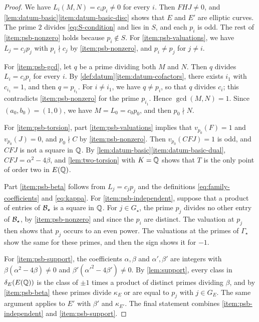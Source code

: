 \begin{proof}
We have $L_i(M,N)=c_ip_i\ne0$ for every $i$. Then $FHJ\ne0$, and \cref{lem:datum-basic}\ref{item:datum-basic-disc} shows that $E$ and $E'$ are elliptic curves. The prime $2$ divides \eqref{eq:S-condition} and lies in $S$, and each $p_i$ is odd. The rest of \ref{item:psb-nonzero} holds because $p_i\notin S$. For \ref{item:psb-valuations}, we have $L_j=c_jp_j$ with $p_{i}\nmid c_j$ by \ref{item:psb-nonzero}, and $p_i\ne p_j$ for $j\ne i$.

For \ref{item:psb-gcd}, let $q$ be a prime dividing both $M$ and $N$. Then $q$ divides $L_i=c_ip_i$ for every $i$. By \cref{def:datum}\ref{item:datum-cofactors}, there exists $i_1$ with $c_{i_1}=1$, and then $q=p_{i_1}$. For $i\ne i_1$, we have $q\ne p_i$, so that $q$ divides $c_i$; this contradicts \ref{item:psb-nonzero} for the prime $p_{i_1}$. Hence $\gcd(M,N)=1$. Since $(a_0,b_0)=(1,0)$, we have $M=L_0=c_0p_0$, and then $p_0\nmid N$.

For \ref{item:psb-torsion}, part \ref{item:psb-valuations} implies that $v_{p_0}(F)=1$ and $v_{p_0}(J)=0$, and $p_0\nmid C$ by \ref{item:psb-nonzero}. Then $v_{p_0}(CFJ)=1$ is odd, and $CFJ$ is not a square in $\mathbb Q$. By \cref{lem:datum-basic}\ref{item:datum-basic-dual}, $CFJ=\alpha^2-4\beta$, and \cref{lem:two-torsion} with $K=\mathbb Q$ shows that $T$ is the only point of order two in $E(\mathbb Q)$.

Part \ref{item:psb-beta} follows from $L_j=c_jp_j$ and the definitions \eqref{eq:family-coefficients} and \eqref{eq:kappa}. For \ref{item:psb-independent}, suppose that a product of entries of $\mathcal B_\star$ is a square in $\mathbb Q$. For $j\in G_\star$, the prime $p_j$ divides no other entry of $\mathcal B_\star$, by \ref{item:psb-nonzero} and since the $p_i$ are distinct. The valuation at $p_j$ then shows that $p_j$ occurs to an even power. The valuations at the primes of $\Gamma_\star$ show the same for these primes, and then the sign shows it for $-1$.

For \ref{item:psb-support}, the coefficients $\alpha,\beta$ and $\alpha',\beta'$ are integers with $\beta(\alpha^2-4\beta)\ne0$ and $\beta'(\alpha'^2-4\beta')\ne0$. By \cref{lem:support}, every class in $\delta_E(E(\mathbb Q))$ is the class of $\pm1$ times a product of distinct primes dividing $\beta$, and by \ref{item:psb-beta} these primes divide $\kappa_E$ or are equal to $p_j$ with $j\in G_E$. The same argument applies to $E'$ with $\beta'$ and $\kappa_{E'}$. The final statement combines \ref{item:psb-independent} and \ref{item:psb-support}.
\end{proof}

